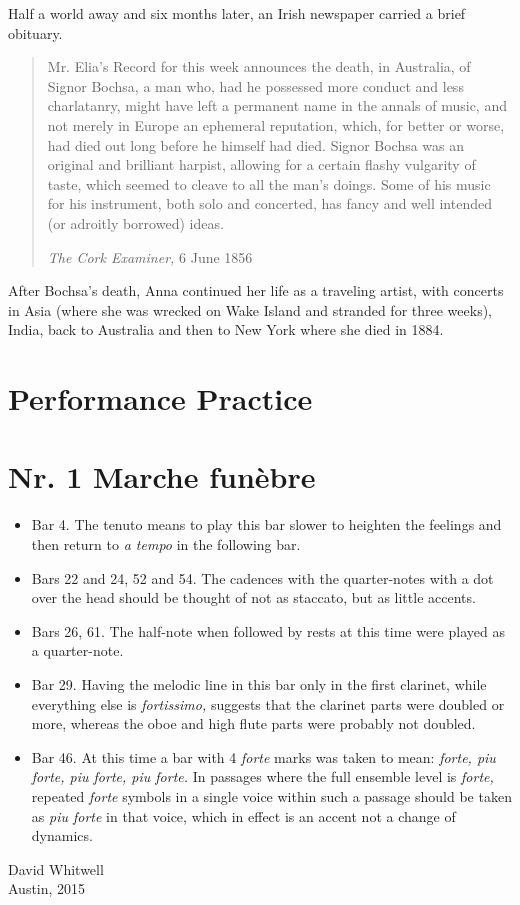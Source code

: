 \documentclass[a4paper, oneside, 12pt]{memoir}
\begin{document}
Half a world away and six months later, an Irish newspaper carried a brief obituary.
\begin{quotation}
  Mr. Elia's Record for this week announces the death, in Australia, of Signor Bochsa, a man who, had he possessed more conduct and less charlatanry, might have left a permanent name in the annals of music, and not merely in Europe an ephemeral reputation, which, for better or worse, had died out long before he himself had died. Signor Bochsa was an original and brilliant harpist, allowing for a certain flashy vulgarity of taste, which seemed to cleave to all the man's doings. Some of his music for his instrument, both solo and concerted, has fancy and well intended (or adroitly borrowed) ideas.
  
\textit{The Cork Examiner,} 6 June 1856
\end{quotation}



After Bochsa's death, Anna continued her life as a traveling artist, with concerts in Asia (where she was wrecked on Wake Island and stranded for three weeks), India, back to Australia and then to New York where she died in 1884.  

\clearpage

\section*{Performance Practice}

\section*{Nr. 1 Marche fun\`{e}bre}
\begin{itemize}
	\item[] Bar 4.  The tenuto means to play this bar slower to heighten the feelings and then return to \textit{a tempo} in the following bar.
	\item[] Bars 22 and 24, 52 and 54.  The cadences with the quarter-notes with a dot over the head should be thought of not as staccato, but as little accents.
	\item[] Bars 26, 61.  The half-note when followed by rests at this time were played as a quarter-note.
	\item[] Bar 29.  Having the melodic line in this bar only in the first clarinet, while everything else is \textit{fortissimo,} suggests that the clarinet parts were doubled or more, whereas the oboe and high flute parts were probably not doubled.
	\item[] Bar 46.  At this time a bar with 4 \textit{forte} marks was taken to mean: \textit{forte, piu forte, piu forte, piu forte.} In passages where the full ensemble level is \textit{forte,} repeated \textit{forte} symbols in a single voice within such a passage should be taken as \textit{piu forte} in that voice, which in effect is an accent not a change of dynamics.
	\end{itemize}
	


\bigskip
\Centering
David Whitwell\\
Austin, 2015\\

\newpage
\thispagestyle{empty}
\mbox{}
\end{document}
